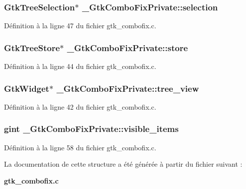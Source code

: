 \subsubsection[{selection}]{\setlength{\rightskip}{0pt plus 5cm}GtkTreeSelection$\ast$ {\bf \_\-GtkComboFixPrivate::selection}}\label{struct__GtkComboFixPrivate_a7283edc61d4be5900784a6c4a5917ea0}


Définition à la ligne 47 du fichier gtk\_\-combofix.c.

\subsubsection[{store}]{\setlength{\rightskip}{0pt plus 5cm}GtkTreeStore$\ast$ {\bf \_\-GtkComboFixPrivate::store}}\label{struct__GtkComboFixPrivate_aaf2d91f9461555c60d3a302040f1196b}


Définition à la ligne 44 du fichier gtk\_\-combofix.c.

\subsubsection[{tree\_\-view}]{\setlength{\rightskip}{0pt plus 5cm}GtkWidget$\ast$ {\bf \_\-GtkComboFixPrivate::tree\_\-view}}\label{struct__GtkComboFixPrivate_ac0f3aa4114c33c98307be782a0009aed}


Définition à la ligne 42 du fichier gtk\_\-combofix.c.

\subsubsection[{visible\_\-items}]{\setlength{\rightskip}{0pt plus 5cm}gint {\bf \_\-GtkComboFixPrivate::visible\_\-items}}\label{struct__GtkComboFixPrivate_a5227b551f466195295a7283a41c29c38}


Définition à la ligne 58 du fichier gtk\_\-combofix.c.



La documentation de cette structure a été générée à partir du fichier suivant :\begin{DoxyCompactItemize}
\item 
{\bf gtk\_\-combofix.c}\end{DoxyCompactItemize}
